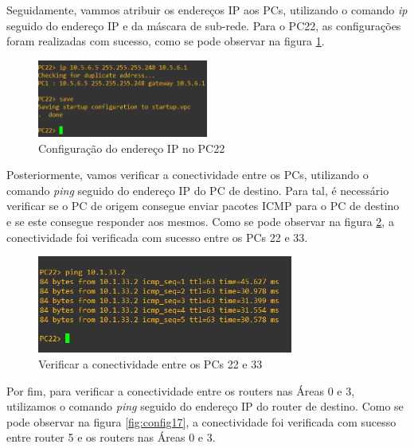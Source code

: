 \documentclass[11pt,english, openright, oneside]{book}
\begin{document}
Seguidamente, vammos atribuir os endereços IP aos PCs, utilizando o comando \textit{ip} seguido do endereço IP e da máscara de sub-rede. Para o PC22, as configurações foram realizadas com sucesso, como se pode observar na figura \ref{fig:config15}.
\vspace{0.2cm}

\begin{figure}[H]
    \centering
    \includegraphics[width=0.5\textwidth]{imagens/Tarefa2/11.pc22_conf.png}
    \caption{Configuração do endereço IP no PC22}
    \label{fig:config15}
\end{figure}
\vspace{0.2cm}

Posteriormente, vamos verificar a conectividade entre os PCs, utilizando o comando \textit{ping} seguido do endereço IP do PC de destino. Para tal, é necessário verificar se o PC de origem consegue enviar pacotes ICMP para o PC de destino e se este consegue responder aos mesmos. Como se pode observar na figura \ref{fig:config16}, a conectividade foi verificada com sucesso entre os PCs 22 e 33.

\begin{figure}[H]
    \centering
    \includegraphics[width=0.75\textwidth]{imagens/Tarefa2/11.ping_pc22_pc33.png}
    \caption{Verificar a conectividade entre os PCs 22 e 33}
    \label{fig:config16}
\end{figure}
\vspace{0.2cm}

\newpage
Por fim, para verificar a conectividade entre os routers nas Áreas 0 e 3, utilizamos o comando \textit{ping} seguido do endereço IP do router de destino. Como se pode observar na figura \ref{fig:config17}, a conectividade foi verificada com sucesso entre router 5 e os routers nas Áreas 0 e 3.
\end{document}
